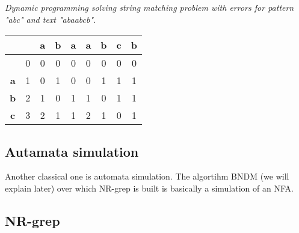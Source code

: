 \begin{example} \emph{Dynamic programming solving string matching problem with errors for pattern "abc" and text "abaabcb".}
\begin{table}[H]
	\centering
	\begin{tabular}{|c|c|c|c|c|c|c|c|c|}
		\hline
		\textbf{}  & \textbf{}                & \textbf{a}               & \textbf{b}               & \textbf{a}               & \textbf{a}               & \textbf{b}               & \textbf{c}               & \textbf{b}               \\ \hline
		& 0                        & 0                        & 0                        & 0                        & 0                        & 0                        & 0                        & 0                        \\ \hline
		\textbf{a} & 1                        & 0 & 1                        & 0                        & {\color[HTML]{32CB00} 0} & 1                        & 1                        & 1                        \\ \hline
		\textbf{b} & 2                        & 1                        & 0                        & 1                        & 1                        & {\color[HTML]{009901} 0} & 1                        & 1                        \\ \hline
		\textbf{c} & {\color[HTML]{3166FF} 3} & {\color[HTML]{FFC702} 2} & {\color[HTML]{F56B00} 1} & {\color[HTML]{F56B00} 1} & {\color[HTML]{FFC702} 2} & {\color[HTML]{F56B00} 1} & {\color[HTML]{009901} 0} & {\color[HTML]{F56B00} 1} \\ \hline
	\end{tabular}
\end{table}

	\label{fig-dynpro}
\end{example}




\subsection{Autamata simulation}
Another classical one is automata simulation. The algortihm BNDM  (we will explain later) over which NR-grep is built is basically a simulation of an NFA. 



\subsection{NR-grep}


